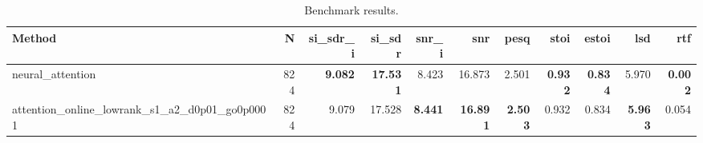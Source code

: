 \begin{table}[t]
\centering
\caption{Benchmark results.}
\label{tab:bench}
\begin{tabular}{lrrrrrrrrrr}
\toprule
Method & N & si\_sdr\_i & si\_sdr & snr\_i & snr & pesq & stoi & estoi & lsd & rtf \\
\midrule
neural_attention & 824 & \textbf{9.082} & \textbf{17.531} & 8.423 & 16.873 & 2.501 & \textbf{0.932} & \textbf{0.834} & 5.970 & \textbf{0.002} \\
attention_online_lowrank_s1_a2_d0p01_go0p0001 & 824 & 9.079 & 17.528 & \textbf{8.441} & \textbf{16.891} & \textbf{2.503} & 0.932 & 0.834 & \textbf{5.963} & 0.054 \\
\bottomrule
\end{tabular}
\end{table}